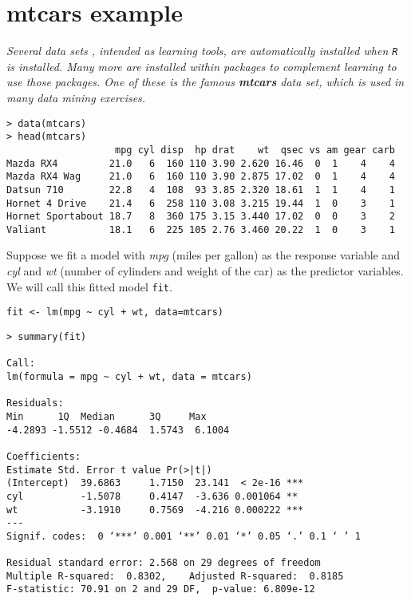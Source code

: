 \documentclass[residuals.tex]{subfiles}
\begin{document}
\Large	
\section{mtcars example} %

\textit{Several data sets , intended as learning tools, are automatically installed when \texttt{R} is installed. Many more are installed within packages to complement learning to use those packages. One of these is the famous \textbf{\textit{mtcars}} data set, which is used in many data mining exercises.}
{
	\large
\begin{framed}
\begin{verbatim}
> data(mtcars)
> head(mtcars)
                   mpg cyl disp  hp drat    wt  qsec vs am gear carb
Mazda RX4         21.0   6  160 110 3.90 2.620 16.46  0  1    4    4
Mazda RX4 Wag     21.0   6  160 110 3.90 2.875 17.02  0  1    4    4
Datsun 710        22.8   4  108  93 3.85 2.320 18.61  1  1    4    1
Hornet 4 Drive    21.4   6  258 110 3.08 3.215 19.44  1  0    3    1
Hornet Sportabout 18.7   8  360 175 3.15 3.440 17.02  0  0    3    2
Valiant           18.1   6  225 105 2.76 3.460 20.22  1  0    3    1

\end{verbatim}
\end{framed}
}
\newpage
\noindent Suppose we fit a model with \textit{mpg} (miles per gallon) as the response variable and \textit{cyl} and \textit{wt} (number of cylinders and weight of the car)
as the predictor variables. We will call this fitted model \texttt{fit}.


\begin{framed}
\begin{verbatim}
fit <- lm(mpg ~ cyl + wt, data=mtcars)
\end{verbatim}
\end{framed}
\newpage
\begin{verbatim}
> summary(fit)

Call:
lm(formula = mpg ~ cyl + wt, data = mtcars)

Residuals:
Min      1Q  Median      3Q     Max 
-4.2893 -1.5512 -0.4684  1.5743  6.1004 

Coefficients:
Estimate Std. Error t value Pr(>|t|)    
(Intercept)  39.6863     1.7150  23.141  < 2e-16 ***
cyl          -1.5078     0.4147  -3.636 0.001064 ** 
wt           -3.1910     0.7569  -4.216 0.000222 ***
---
Signif. codes:  0 ‘***’ 0.001 ‘**’ 0.01 ‘*’ 0.05 ‘.’ 0.1 ‘ ’ 1

Residual standard error: 2.568 on 29 degrees of freedom
Multiple R-squared:  0.8302,    Adjusted R-squared:  0.8185 
F-statistic: 70.91 on 2 and 29 DF,  p-value: 6.809e-12
\end{verbatim}
\newpage
\end{document}
